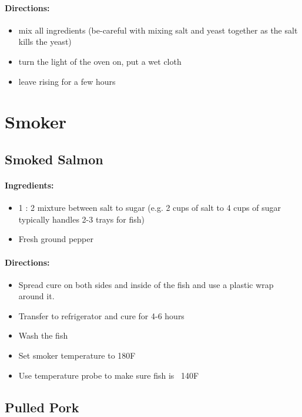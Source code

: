 \documentclass{article}
\begin{document}
\paragraph{Directions:}
\begin{itemize}
	\item mix all ingredients (be-careful with mixing salt and yeast together as the salt kills the yeast)
	\item turn the light of the oven on, put a wet cloth
	\item leave rising for a few hours
\end{itemize}

\section{Smoker}

\subsection{Smoked Salmon}{}

\paragraph{Ingredients:}

\begin{itemize}
	\item 1 : 2 mixture between salt to sugar (e.g. 2 cups of salt to 4 cups of sugar typically handles 2-3 trays for fish)
	\item Fresh ground pepper
\end{itemize}

\paragraph{Directions:}
\begin{itemize}
	\item Spread cure on both sides and inside of the fish and use a plastic wrap around it.
	\item Transfer to refrigerator and cure for 4-6 hours
	\item Wash the fish
	\item Set smoker temperature to 180F
	\item Use temperature probe to make sure fish is ~140F
\end{itemize}


\subsection{Pulled Pork}{}
\end{document}
